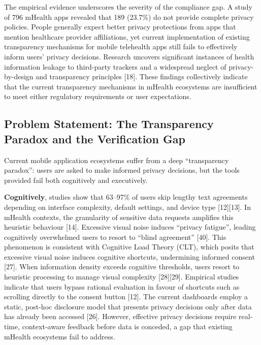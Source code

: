 The empirical evidence underscores the severity of the compliance gap. A study of 796 mHealth apps revealed that 189 (23.7\%) do not provide complete privacy policies. People generally expect better privacy protections from apps that mention healthcare provider affiliations, yet current implementation of existing transparency mechanisms for mobile telehealth apps still fails to effectively inform users' privacy decisions. Research uncovers significant instances of health information leakage to third-party trackers and a widespread neglect of privacy-by-design and transparency principles [18]. These findings collectively indicate that the current transparency mechanisms in mHealth ecosystems are insufficient to meet either regulatory requirements or user expectations.

\subsection{Problem Statement: The Transparency Paradox and the Verification Gap}

Current mobile application ecosystems suffer from a deep ``transparency paradox'': users are asked to make informed privacy decisions, but the tools provided fail both cognitively and executively.

\textbf{Cognitively}, studies show that 63--97\% of users skip lengthy text agreements depending on interface complexity, default settings, and device type [12][13]. In mHealth contexts, the granularity of sensitive data requests amplifies this heuristic behaviour [14]. Excessive visual noise induces ``privacy fatigue'', leading cognitively overwhelmed users to resort to ``blind agreement'' [40]. This phenomenon is consistent with Cognitive Load Theory (CLT), which posits that excessive visual noise induces cognitive shortcuts, undermining informed consent [27]. When information density exceeds cognitive thresholds, users resort to heuristic processing to manage visual complexity [28][29]. Empirical studies indicate that users bypass rational evaluation in favour of shortcuts such as scrolling directly to the consent button [12]. The current dashboards employ a static, post-hoc disclosure model that presents privacy decisions only after data has already been accessed [26]. However, effective privacy decisions require real-time, context-aware feedback before data is conceded, a gap that existing mHealth ecosystems fail to address.

